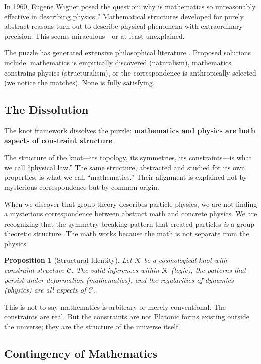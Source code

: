 \documentclass[11pt,a4paper]{article}
\newtheorem{proposition}{Proposition}
\begin{document}
In 1960, Eugene Wigner posed the question: why is mathematics so unreasonably effective in describing physics \cite{wigner1960}? Mathematical structures developed for purely abstract reasons turn out to describe physical phenomena with extraordinary precision. This seems miraculous---or at least unexplained.

The puzzle has generated extensive philosophical literature \cite{steiner1998, colyvan2001}. Proposed solutions include: mathematics is empirically discovered (naturalism), mathematics constrains physics (structuralism), or the correspondence is anthropically selected (we notice the matches). None is fully satisfying.

\subsection{The Dissolution}

The knot framework dissolves the puzzle: \textbf{mathematics and physics are both aspects of constraint structure}.

The structure of the knot---its topology, its symmetries, its constraints---is what we call ``physical law.'' The same structure, abstracted and studied for its own properties, is what we call ``mathematics.'' Their alignment is explained not by mysterious correspondence but by common origin.

When we discover that group theory describes particle physics, we are not finding a mysterious correspondence between abstract math and concrete physics. We are recognizing that the symmetry-breaking pattern that created particles \emph{is} a group-theoretic structure. The math works because the math is not separate from the physics.

\begin{proposition}[Structural Identity]
Let $\mathcal{K}$ be a cosmological knot with constraint structure $\mathcal{C}$. The valid inferences within $\mathcal{K}$ (logic), the patterns that persist under deformation (mathematics), and the regularities of dynamics (physics) are all aspects of $\mathcal{C}$.
\end{proposition}

This is not to say mathematics is arbitrary or merely conventional. The constraints are real. But the constraints are not Platonic forms existing outside the universe; they are the structure of the universe itself.

\subsection{Contingency of Mathematics}
\end{document}
